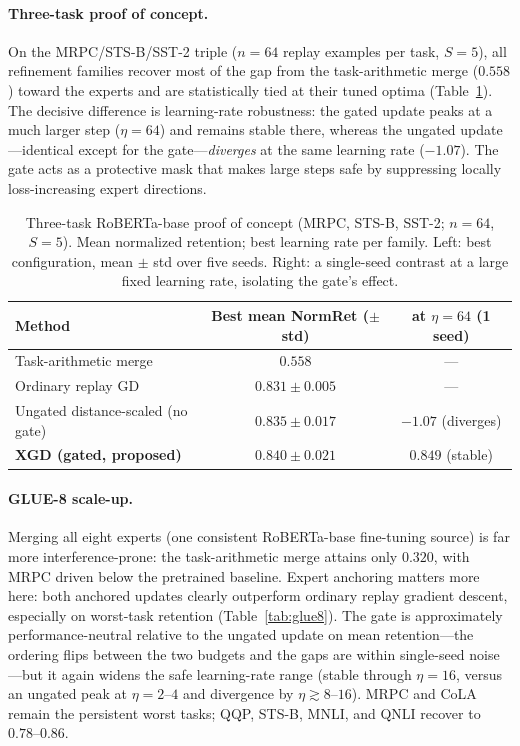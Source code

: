 \documentclass{article} %
\begin{document}
\paragraph{Three-task proof of concept.}
On the MRPC/STS-B/SST-2 triple ($n=64$ replay examples per task, $S=5$), all refinement families recover most of the gap from the task-arithmetic merge ($0.558$) toward the experts and are statistically tied at their tuned optima (Table~\ref{tab:poc3}). The decisive difference is learning-rate robustness: the gated update peaks at a much larger step ($\eta=64$) and remains stable there, whereas the ungated update---identical except for the gate---\emph{diverges} at the same learning rate ($-1.07$). The gate acts as a protective mask that makes large steps safe by suppressing locally loss-increasing expert directions.

\begin{table}[t]
\centering
\caption{Three-task RoBERTa-base proof of concept (MRPC, STS-B, SST-2; $n=64$, $S=5$). Mean normalized retention; best learning rate per family. Left: best configuration, mean $\pm$ std over five seeds. Right: a single-seed contrast at a large fixed learning rate, isolating the gate's effect.}
\label{tab:poc3}
\begin{tabular}{lcc}
\toprule
Method & Best mean NormRet ($\pm$ std) & at $\eta=64$ (1 seed) \\
\midrule
Task-arithmetic merge & $0.558$ & --- \\
Ordinary replay GD & $0.831\pm0.005$ & --- \\
Ungated distance-scaled (no gate) & $0.835\pm0.017$ & $-1.07$ (diverges) \\
\textbf{XGD (gated, proposed)} & $\mathbf{0.840\pm0.021}$ & $\mathbf{0.849}$ (stable) \\
\bottomrule
\end{tabular}
\end{table}

\paragraph{GLUE-8 scale-up.}
Merging all eight experts (one consistent RoBERTa-base fine-tuning source) is far more interference-prone: the task-arithmetic merge attains only $0.320$, with MRPC driven below the pretrained baseline. Expert anchoring matters more here: both anchored updates clearly outperform ordinary replay gradient descent, especially on worst-task retention (Table~\ref{tab:glue8}). The gate is approximately performance-neutral relative to the ungated update on mean retention---the ordering flips between the two budgets and the gaps are within single-seed noise---but it again widens the safe learning-rate range (stable through $\eta=16$, versus an ungated peak at $\eta=2\text{--}4$ and divergence by $\eta\gtrsim 8\text{--}16$). MRPC and CoLA remain the persistent worst tasks; QQP, STS-B, MNLI, and QNLI recover to $0.78\text{--}0.86$.
\end{document}
